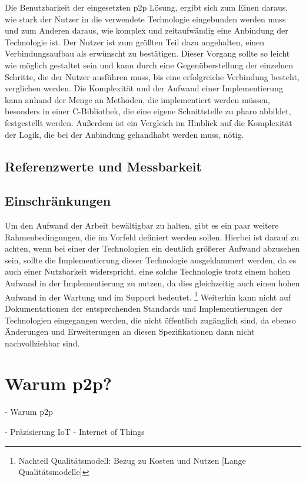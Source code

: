 \documentclass[12pt,a4paper]{article}
\begin{document}
\begin{enumerate}
    	Die Benutzbarkeit der eingesetzten p2p Lösung, ergibt sich zum Einen daraus, wie stark der Nutzer in die verwendete Technologie eingebunden werden muss und zum Anderen daraus, wie komplex und zeitaufwändig eine Anbindung der Technologie ist.
    	Der Nutzer ist zum größten Teil dazu angehalten, einen Verbindungsaufbau als erwünscht zu bestätigen. Dieser Vorgang sollte so leicht wie möglich gestaltet sein und kann durch eine Gegenüberstellung der einzelnen Schritte, die der Nutzer ausführen muss, bis eine erfolgreiche Verbindung besteht, verglichen werden.
    	Die Komplexität und der Aufwand einer Implementierung kann anhand der Menge an Methoden, die implementiert werden müssen, besonders in einer C-Bibliothek, die eine eigene Schnittstelle zu pharo abbildet, festgestellt werden. Außerdem ist ein Vergleich im Hinblick auf die Komplexität der Logik, die bei der Anbindung gehandhabt werden muss, nötig.
    	\end{enumerate}
    	\subsection{Referenzwerte und Messbarkeit}

		\subsection{Einschränkungen}
		Um den Aufwand der Arbeit bewältigbar zu halten, gibt es ein paar weitere Rahmenbedingungen, die im Vorfeld definiert werden sollen. Hierbei ist darauf zu achten, wenn bei einer der Technologien ein deutlich größerer Aufwand abzusehen sein, sollte die Implementierung dieser Technologie ausgeklammert werden, da es auch einer Nutzbarkeit widerspricht, eine solche Technologie trotz einem hohen Aufwand in der Implementierung zu nutzen, da dies gleichzeitig auch einen hohen Aufwand in der Wartung und im Support bedeutet. \footnote{Nachteil Qualitätsmodell: Bezug zu Kosten und Nutzen [Lange Qualitätsmodelle]}
		Weiterhin kann nicht auf Dokumentationen der entsprechenden Standards und Implementierungen der Technologien eingegangen werden, die nicht öffentlich zugänglich sind, da ebenso Änderungen und Erweiterungen an diesen Spezifikationen dann nicht nachvollziehbar sind.
		
    \section{Warum p2p?}		
    - Warum p2p

    - Präzisierung IoT - Internet of Things
\end{document}
